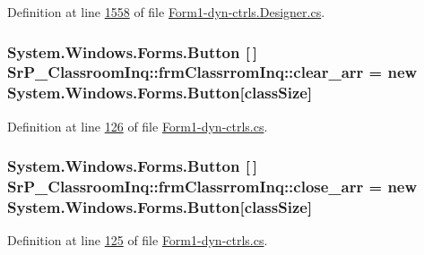 \-Definition at line \hyperlink{_form1-dyn-ctrls_8_designer_8cs_source_l01558}{1558} of file \hyperlink{_form1-dyn-ctrls_8_designer_8cs_source}{\-Form1-\/dyn-\/ctrls.\-Designer.\-cs}.

\hypertarget{class_sr_p___classroom_inq_1_1frm_classrrom_inq_a1c427c3d5bb61c96ca798e5f6aaff8f4}{
\subsubsection[{clear\-\_\-arr}]{\setlength{\rightskip}{0pt plus 5cm}\-System.\-Windows.\-Forms.\-Button \mbox{[}$\,$\mbox{]} {\bf \-Sr\-P\-\_\-\-Classroom\-Inq\-::frm\-Classrrom\-Inq\-::clear\-\_\-arr} = new \-System.\-Windows.\-Forms.\-Button\mbox{[}{\bf class\-Size}\mbox{]}}}
\label{class_sr_p___classroom_inq_1_1frm_classrrom_inq_a1c427c3d5bb61c96ca798e5f6aaff8f4}


\-Definition at line \hyperlink{_form1-dyn-ctrls_8cs_source_l00126}{126} of file \hyperlink{_form1-dyn-ctrls_8cs_source}{\-Form1-\/dyn-\/ctrls.\-cs}.

\hypertarget{class_sr_p___classroom_inq_1_1frm_classrrom_inq_a4758f35d344b79b972e88a42cb660904}{
\subsubsection[{close\-\_\-arr}]{\setlength{\rightskip}{0pt plus 5cm}\-System.\-Windows.\-Forms.\-Button \mbox{[}$\,$\mbox{]} {\bf \-Sr\-P\-\_\-\-Classroom\-Inq\-::frm\-Classrrom\-Inq\-::close\-\_\-arr} = new \-System.\-Windows.\-Forms.\-Button\mbox{[}{\bf class\-Size}\mbox{]}}}
\label{class_sr_p___classroom_inq_1_1frm_classrrom_inq_a4758f35d344b79b972e88a42cb660904}


\-Definition at line \hyperlink{_form1-dyn-ctrls_8cs_source_l00125}{125} of file \hyperlink{_form1-dyn-ctrls_8cs_source}{\-Form1-\/dyn-\/ctrls.\-cs}.

